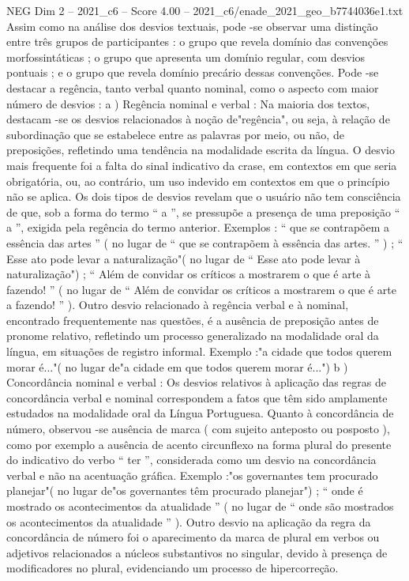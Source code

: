 \begin{textsample}{NEG Dim 2 – 2021\_c6 – Score 4.00 – 2021\_c6/enade\_2021\_geo\_b7744036e1.txt}
Assim como na análise dos desvios textuais, pode -se observar uma distinção entre três grupos de participantes : o grupo que revela domínio das convenções morfossintáticas ; o grupo que apresenta um domínio regular, com desvios pontuais ; e o grupo que revela domínio precário dessas convenções.
Pode -se destacar a regência, tanto verbal quanto nominal, como o aspecto com maior número de desvios : a ) Regência nominal e verbal : Na maioria dos textos, destacam -se os desvios relacionados à noção de"regência", ou seja, à relação de subordinação que se estabelece entre as palavras por meio, ou não, de preposições, refletindo uma tendência na modalidade escrita da língua.
O desvio mais frequente foi a falta do sinal indicativo da crase, em contextos em que seria obrigatória, ou, ao contrário, um uso indevido em contextos em que o princípio não se aplica.
Os dois tipos de desvios revelam que o usuário não tem consciência de que, sob a forma do termo “ a ”, se pressupõe a presença de uma preposição “ a ”, exigida pela regência do termo anterior.
Exemplos : “ que se contrapõem a essência das artes ” ( no lugar de “ que se contrapõem à essência das artes. ” ) ; “ Esse ato pode levar a naturalização"( no lugar de “ Esse ato pode levar à naturalização") ; “ Além de convidar os críticos a mostrarem o que é arte à fazendo! ” ( no lugar de “ Além de convidar os críticos a mostrarem o que é arte a fazendo! ” ).
Outro desvio relacionado à regência verbal e à nominal, encontrado frequentemente nas questões, é a ausência de preposição antes de pronome relativo, refletindo um processo generalizado na modalidade oral da língua, em situações de registro informal.
Exemplo :"a cidade que todos querem morar é..."( no lugar de"a cidade em que todos querem morar é...") b ) Concordância nominal e verbal : Os desvios relativos à aplicação das regras de concordância verbal e nominal correspondem a fatos que têm sido amplamente estudados na modalidade oral da Língua Portuguesa.
Quanto à concordância de número, observou -se ausência de marca ( com sujeito anteposto ou posposto ), como por exemplo a ausência de acento circunflexo na forma plural do presente do indicativo do verbo “ ter ”, considerada como um desvio na concordância verbal e não na acentuação gráfica.
Exemplo :"os governantes tem procurado planejar"( no lugar de"os governantes têm procurado planejar") ; “ onde é mostrado os acontecimentos da atualidade ” ( no lugar de “ onde são mostrados os acontecimentos da atualidade ” ).
Outro desvio na aplicação da regra da concordância de número foi o aparecimento da marca de plural em verbos ou adjetivos relacionados a núcleos substantivos no singular, devido à presença de modificadores no plural, evidenciando um processo de hipercorreção.

\end{textsample}
